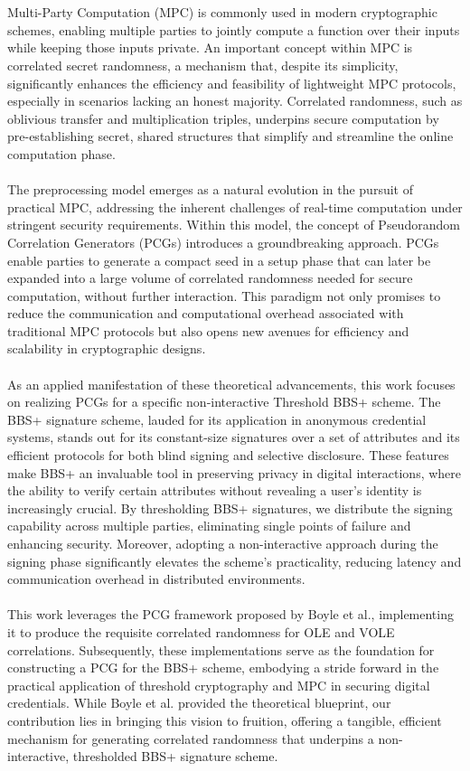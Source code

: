\\\\
Multi-Party Computation (MPC) is commonly used in modern cryptographic schemes, enabling multiple parties to jointly compute a function over their inputs while keeping those inputs private. An important concept within MPC is correlated secret randomness, a mechanism that, despite its simplicity, significantly enhances the efficiency and feasibility of lightweight MPC protocols, especially in scenarios lacking an honest majority. Correlated randomness, such as oblivious transfer and multiplication triples, underpins secure computation by pre-establishing secret, shared structures that simplify and streamline the online computation phase.
\\\\
The preprocessing model emerges as a natural evolution in the pursuit of practical MPC, addressing the inherent challenges of real-time computation under stringent security requirements. Within this model, the concept of Pseudorandom Correlation Generators (PCGs) introduces a groundbreaking approach. PCGs enable parties to generate a compact seed in a setup phase that can later be expanded into a large volume of correlated randomness needed for secure computation, without further interaction. This paradigm not only promises to reduce the communication and computational overhead associated with traditional MPC protocols but also opens new avenues for efficiency and scalability in cryptographic designs.
\\\\
As an applied manifestation of these theoretical advancements, this work focuses on realizing PCGs for a specific non-interactive Threshold BBS+ scheme. The BBS+ signature scheme, lauded for its application in anonymous credential systems, stands out for its constant-size signatures over a set of attributes and its efficient protocols for both blind signing and selective disclosure. These features make BBS+ an invaluable tool in preserving privacy in digital interactions, where the ability to verify certain attributes without revealing a user's identity is increasingly crucial. By thresholding BBS+ signatures, we distribute the signing capability across multiple parties, eliminating single points of failure and enhancing security. Moreover, adopting a non-interactive approach during the signing phase significantly elevates the scheme's practicality, reducing latency and communication overhead in distributed environments.
\\\\
This work leverages the PCG framework proposed by Boyle et al., implementing it to produce the requisite correlated randomness for OLE and VOLE correlations. Subsequently, these implementations serve as the foundation for constructing a PCG for the BBS+ scheme, embodying a stride forward in the practical application of threshold cryptography and MPC in securing digital credentials. While Boyle et al. provided the theoretical blueprint, our contribution lies in bringing this vision to fruition, offering a tangible, efficient mechanism for generating correlated randomness that underpins a non-interactive, thresholded BBS+ signature scheme.

